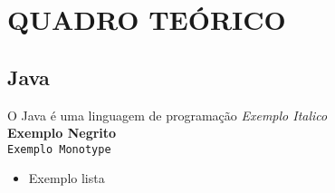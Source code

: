 \chapter{QUADRO TEÓRICO}
\section{Java}
\par O Java é uma linguagem de programação
\textit{Exemplo Italico}\\
\textbf{Exemplo Negrito}\\
\texttt{Exemplo Monotype}\\

\begin{itemize}
	\item Exemplo lista 
\end{itemize}
	 